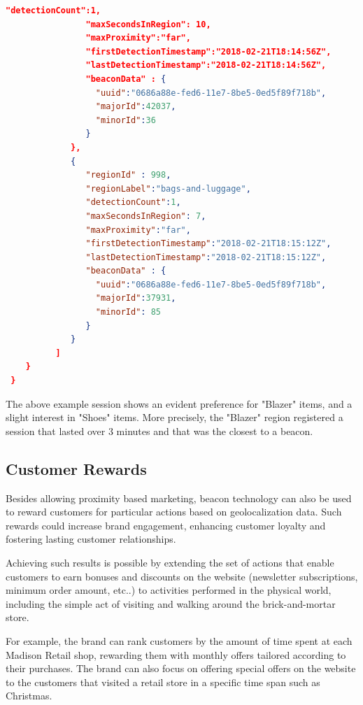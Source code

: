 \begin{lstlisting}[language=json,firstnumber=1]
                "detectionCount":1,
                "maxSecondsInRegion": 10,
                "maxProximity":"far",
                "firstDetectionTimestamp":"2018-02-21T18:14:56Z",
                "lastDetectionTimestamp":"2018-02-21T18:14:56Z",
                "beaconData" : {
                  "uuid":"0686a88e-fed6-11e7-8be5-0ed5f89f718b",
                  "majorId":42037,
                  "minorId":36
                }
             },
             {
                "regionId" : 998,
                "regionLabel":"bags-and-luggage",
                "detectionCount":1,
                "maxSecondsInRegion": 7,
                "maxProximity":"far",
                "firstDetectionTimestamp":"2018-02-21T18:15:12Z",
                "lastDetectionTimestamp":"2018-02-21T18:15:12Z",
                "beaconData" : {
                  "uuid":"0686a88e-fed6-11e7-8be5-0ed5f89f718b",
                  "majorId":37931,
                  "minorId": 85
                }
             }
          ]
    }
 }
  \end{lstlisting}
\vspace{0.5cm}


The above example session shows an evident preference for "Blazer" items, and a slight interest in "Shoes" items. More precisely, the "Blazer" region registered a session that lasted over 3 minutes and that was the closest to a beacon.  

\subsection{Customer Rewards}

Besides allowing proximity based marketing, beacon technology can also be used to reward customers for particular actions based on geolocalization data. Such rewards could increase brand engagement, enhancing customer loyalty and fostering lasting customer relationships. 

Achieving such results is possible by extending the set of actions that enable customers to earn bonuses and discounts on the website (newsletter subscriptions, minimum order amount, etc..) to activities performed in the physical world, including the simple act of visiting and walking around the brick-and-mortar store.

For example, the brand can rank customers by the amount of time spent at each Madison Retail shop, rewarding them with monthly offers tailored according to their purchases. The brand can also focus on offering special offers on the website to the customers that visited a retail store in a specific time span such as Christmas.

